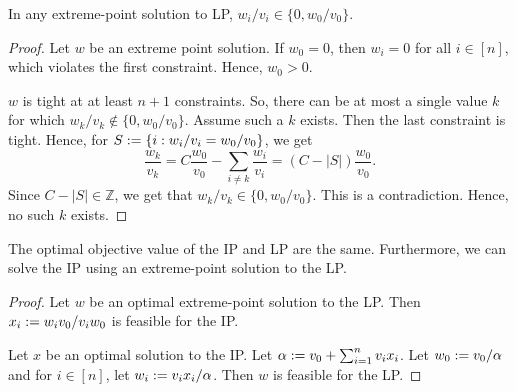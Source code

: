 \documentclass[a4paper,12pt,fleqn]{article}
\begin{document}
\begin{lemma}
In any extreme-point solution to LP, $w_i/v_i \in \{0, w_0/v_0\}$.
\end{lemma}
\begin{proof}
Let $w$ be an extreme point solution.
If $w_0 = 0$, then $w_i = 0$ for all $i \in [n]$,
which violates the first constraint. Hence, $w_0 > 0$.

$w$ is tight at at least $n+1$ constraints.
So, there can be at most a single value $k$ for which $w_k/v_k \not\in \{0, w_0/v_0\}$.
Assume such a $k$ exists. Then the last constraint is tight.
Hence, for $S := \{i: w_i/v_i = w_0/v_0\}$, we get
\[ \frac{w_k}{v_k} = C\frac{w_0}{v_0} - \sum_{i \neq k} \frac{w_i}{v_i} = (C-|S|)\frac{w_0}{v_0}. \]
Since $C - |S| \in \mathbb{Z}$, we get that $w_k/v_k \in \{0, w_0/v_0\}$.
This is a contradiction. Hence, no such $k$ exists.
\end{proof}

\begin{lemma}[LP vs IP]
The optimal objective value of the IP and LP are the same.
Furthermore, we can solve the IP using an extreme-point solution to the LP.
\end{lemma}
\begin{proof}
Let $w$ be an optimal extreme-point solution to the LP.
Then $x_i := w_iv_0/v_iw_0$ is feasible for the IP.

Let $x$ be an optimal solution to the IP.
Let $\alpha := v_0 + \sum_{i=1}^n v_ix_i$.
Let $w_0 := v_0/\alpha$ and for $i \in [n]$, let $w_i := v_ix_i/\alpha$.
Then $w$ is feasible for the LP.
\end{proof}
\end{document}
